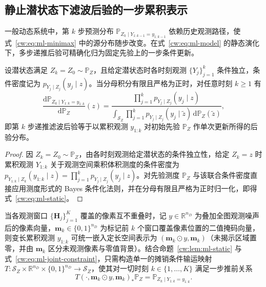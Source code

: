 \subsection{静止潜状态下滤波后验的一步累积表示}\label{cw:sec:ml-static-theory}

一般动态系统中，第 $k$ 步预测分布 $\mathbb P_{Z_k\mid Y_{1:k-1}=y_{1:k-1}}$ 依赖历史观测路径，使式~\eqref{cw:eq:ml-minimax} 中的源分布随步改变。在式~\eqref{cw:eq:ml-model} 的静态演化下，多步递推后验可精确化归为固定先验上的一步条件更新。

\begin{proposition}[静止状态下滤波后验的一步表示]\label{cw:lem:ml-static}
设潜状态满足 $Z_k=Z_0\sim\mathbb P_Z$，且给定潜状态时各时刻观测 $\{Y_j\}_{j=1}^k$ 条件独立，条件密度记为 $p_{Y_j\mid Z_j}(y_j\mid z)$。当分母积分有限且严格为正时，对任意时刻 $k\ge1$ 有
\begin{equation}\label{cw:eq:ml-static}
\frac{\mathrm d\mathbb P_{Z_k\mid Y_{1:k}=y_{1:k}}}{\mathrm d\mathbb P_Z}(z)
=\frac{\prod_{j=1}^k p_{Y_j\mid Z_j}(y_j\mid z)}{\int_{\mathcal S_Z}\prod_{j=1}^k p_{Y_j\mid Z_j}(y_j\mid\tilde z)\,\mathrm d\mathbb P_Z(\tilde z)},
\end{equation}
即第 $k$ 步递推滤波后验等于以累积观测 $y_{1:k}$ 对初始先验 $\mathbb P_Z$ 作单次更新所得的后验分布。
\end{proposition}
\begin{proof}
因 $Z_k=Z_0\sim\mathbb P_Z$，由各时刻观测给定潜状态的条件独立性，给定 $Z_k=z$ 时累积观测 $Y_{1:k}$ 关于观测空间乘积体积测度的条件密度为 $p_{Y_{1:k}\mid Z_k}(y_{1:k}\mid z)=\prod_{j=1}^k p_{Y_j\mid Z_j}(y_j\mid z)$。对先验测度 $\mathbb P_Z$ 与该联合条件密度直接应用测度形式的 Bayes 条件化法则，并在分母有限且严格为正时归一化，即得式~\eqref{cw:eq:ml-static}。
\end{proof}

当各观测窗口 $\{\bm H_j\}_{j=1}^K$ 覆盖的像素互不重叠时，记 $y\in\mathbb R^{n_D}$ 为叠加全图观测噪声后的像素向量，$\bm m_k\in\{0,1\}^{n_D}$ 为标记前 $k$ 个窗口覆盖像素位置的二值掩码向量，则变长累积观测 $y_{1:k}$ 可统一嵌入定长空间表示为 $(\bm m_k\odot y,\bm m_k)$（未揭示区域置零，并由 $\bm m_k$ 区分未观测像素与零值背景）。结合命题~\ref{cw:lem:ml-static} 与式~\eqref{cw:eq:ml-joint-constraint}，只需构造单一的摊销条件输运映射 $T:\mathcal S_Z\times\mathbb R^{n_D}\times\{0,1\}^{n_D}\to\mathcal S_Z$，使其对一切时刻 $k\in\{1,\dots,K\}$ 满足一步推前关系
\begin{equation}\label{cw:eq:ml-amortized-pushforward}
T(\cdot,\bm m_k\odot y,\bm m_k)_*\mathbb P_Z=\mathbb P_{Z_k\mid Y_{1:k}=y_{1:k}}.
\end{equation}
